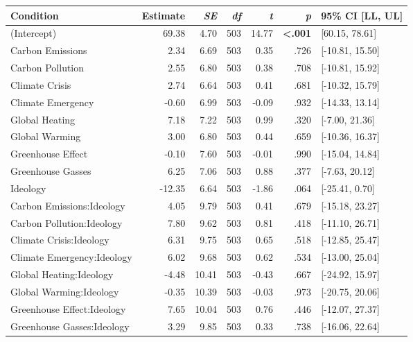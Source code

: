 \begin{table}[ht]
\centering
\begin{tabular}{lrrrrrl}
  \hline
Condition & Estimate & \textit{SE} & \textit{df} & \textit{t} & \textit{p} & 95\% CI [LL, UL] \\ 
  \hline
(Intercept) & 69.38 & 4.70 & 503 & 14.77 & \textbf{\textless  .001} & [60.15, 78.61] \\ 
  Carbon Emissions & 2.34 & 6.69 & 503 & 0.35 & .726 & [-10.81, 15.50] \\ 
  Carbon Pollution & 2.55 & 6.80 & 503 & 0.38 & .708 & [-10.81, 15.92] \\ 
  Climate Crisis & 2.74 & 6.64 & 503 & 0.41 & .681 & [-10.32, 15.79] \\ 
  Climate Emergency & -0.60 & 6.99 & 503 & -0.09 & .932 & [-14.33, 13.14] \\ 
  Global Heating & 7.18 & 7.22 & 503 & 0.99 & .320 & [-7.00, 21.36] \\ 
  Global Warming & 3.00 & 6.80 & 503 & 0.44 & .659 & [-10.36, 16.37] \\ 
  Greenhouse Effect & -0.10 & 7.60 & 503 & -0.01 & .990 & [-15.04, 14.84] \\ 
  Greenhouse Gasses & 6.25 & 7.06 & 503 & 0.88 & .377 & [-7.63, 20.12] \\ 
  Ideology & -12.35 & 6.64 & 503 & -1.86 & .064 & [-25.41, 0.70] \\ 
  Carbon Emissions:Ideology & 4.05 & 9.79 & 503 & 0.41 & .679 & [-15.18, 23.27] \\ 
  Carbon Pollution:Ideology & 7.80 & 9.62 & 503 & 0.81 & .418 & [-11.10, 26.71] \\ 
  Climate Crisis:Ideology & 6.31 & 9.75 & 503 & 0.65 & .518 & [-12.85, 25.47] \\ 
  Climate Emergency:Ideology & 6.02 & 9.68 & 503 & 0.62 & .534 & [-13.00, 25.04] \\ 
  Global Heating:Ideology & -4.48 & 10.41 & 503 & -0.43 & .667 & [-24.92, 15.97] \\ 
  Global Warming:Ideology & -0.35 & 10.39 & 503 & -0.03 & .973 & [-20.75, 20.06] \\ 
  Greenhouse Effect:Ideology & 7.65 & 10.04 & 503 & 0.76 & .446 & [-12.07, 27.37] \\ 
  Greenhouse Gasses:Ideology & 3.29 & 9.85 & 503 & 0.33 & .738 & [-16.06, 22.64] \\ 
   \hline
\end{tabular}
\end{table}
